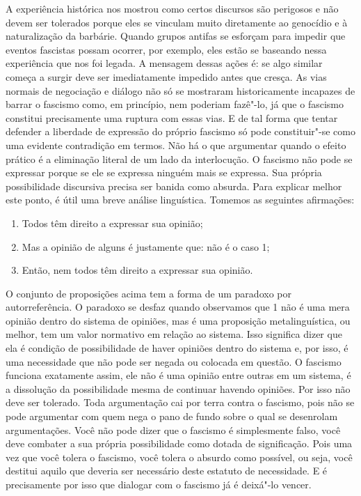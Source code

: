 A experiência histórica nos mostrou como certos discursos são perigosos
e não devem ser tolerados porque eles se vinculam muito diretamente ao
genocídio e à naturalização da barbárie. Quando grupos antifas se
esforçam para impedir que eventos fascistas possam ocorrer, por exemplo,
eles estão se baseando nessa experiência que nos foi legada. A mensagem
dessas ações é: se algo similar começa a surgir deve ser imediatamente
impedido antes que cresça. As vias normais de negociação e
diálogo não só se mostraram historicamente incapazes de barrar o fascismo
como, em princípio, nem poderiam fazê"-lo, já que o fascismo constitui
precisamente uma ruptura com essas vias. E de tal forma que tentar
defender a liberdade de expressão do próprio fascismo só
pode constituir"-se como uma evidente contradição em termos. Não há o que
argumentar quando o efeito prático é a eliminação literal de um lado da
interlocução. O fascismo não pode se expressar porque se ele se expressa
ninguém mais se expressa. Sua própria possibilidade discursiva precisa
ser banida como absurda. Para explicar melhor este ponto, é útil uma
breve análise linguística. Tomemos as seguintes afirmações:

\begin{enumerate}
\item
Todos têm direito a expressar sua opinião;

\item
Mas a opinião de alguns é justamente que: não é o caso 1;

\item
Então, nem todos têm direito a expressar sua opinião.
\end{enumerate}

O conjunto de proposições acima tem a forma de um paradoxo por
autorreferência. O paradoxo se desfaz quando observamos que 1 não é uma
mera opinião dentro do sistema de opiniões, mas é uma proposição
metalinguística, ou melhor, tem um valor normativo em relação ao
sistema. Isso significa dizer que ela é condição de possibilidade de
haver opiniões dentro do sistema e, por isso, é uma necessidade que
não pode ser negada ou colocada em questão. O fascismo funciona
exatamente assim, ele não é uma opinião entre outras em um sistema, é a
dissolução da possibilidade mesma de continuar havendo opiniões. Por
isso não deve ser tolerado. Toda argumentação cai por
terra contra o fascismo, pois não se pode argumentar com quem nega o pano de fundo sobre o
qual se desenrolam argumentações. Você não pode dizer que o fascismo é
simplesmente falso, você deve combater a sua própria possibilidade como
dotada de significação. Pois uma vez que você tolera o fascismo, você
tolera o absurdo como possível, ou seja, você destitui aquilo que
deveria ser necessário deste estatuto de necessidade. E é precisamente
por isso que dialogar com o fascismo já é deixá"-lo vencer.


